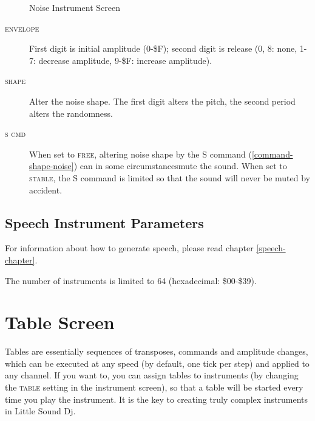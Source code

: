 \begin{figure}[htpb]
	\begin{center}
	\end{center}
	\caption{Noise Instrument Screen}
	\label{fig:instr-noise}
\end{figure}

\begin{description}
	\item[\textsc{envelope}] First digit is initial amplitude (0-\$F); second digit is release (0, 8: none, 1-7: decrease amplitude, 9-\$F: increase amplitude).
	\item[\textsc{shape}] Alter the noise shape. The first digit alters the pitch, the second
period alters the randomness.
	\item[\textsc{s cmd}] When set to \textsc{free}, altering noise shape by the \textsc{S}
command (\ref{command-shape-noise}) can in some circumstances\footnotemark mute the sound. When set to \textsc{stable}, the
\textsc{S} command is limited so that the sound will never be muted by accident.
\end{description}

\subsection{Speech Instrument Parameters}

For information about how to generate speech, please read chapter \ref{speech-chapter}.

The number of instruments is limited to 64 (hexadecimal: \$00-\$39).

\section{Table Screen}

Tables are essentially sequences of transposes, commands and amplitude changes, which can be executed at any speed (by default, one tick per step) and applied to any channel. If you want to, you can assign tables to instruments (by changing the \textsc{table} setting in the instrument screen), so that a table will be started every time you play the instrument. It is the key to creating truly complex instruments in Little Sound Dj.

